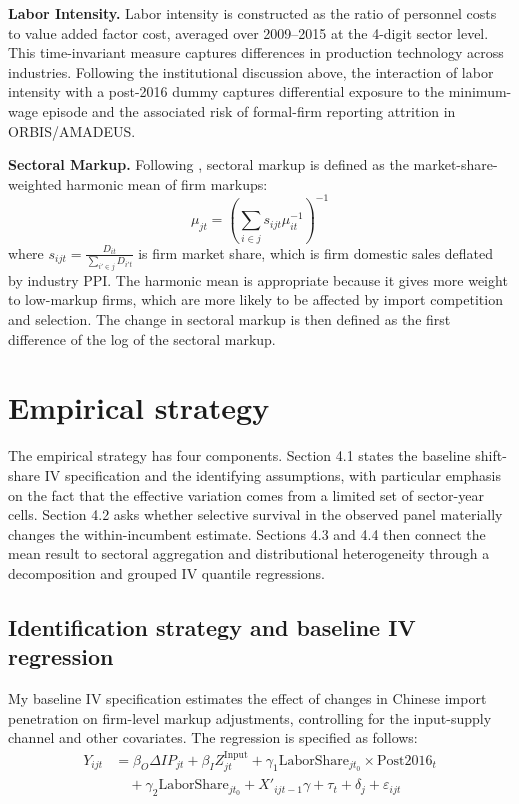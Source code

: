 ﻿\documentclass[12pt]{article}
\begin{document}
\textbf{Labor Intensity.} Labor intensity is constructed as the ratio of personnel costs to value added factor cost, averaged over 2009--2015 at the 4-digit sector level. This time-invariant measure captures differences in production technology across industries. Following the institutional discussion above, the interaction of labor intensity with a post-2016 dummy captures differential exposure to the minimum-wage episode and the associated risk of formal-firm reporting attrition in ORBIS/AMADEUS.

\textbf{Sectoral Markup.} Following \textcite{bursteinBottomUpMarkupFluctuations2025}, sectoral markup is defined as the market-share-weighted harmonic mean of firm markups:
\[
\mu_{jt} = \left( \sum_{i \in j} s_{ijt} \mu_{it}^{-1} \right)^{-1}
\]
where $s_{ijt} = \frac{D_{it}}{\sum_{i' \in j} D_{i't}}$ is firm market share, which is firm domestic sales deflated by industry PPI. The harmonic mean is appropriate because it gives more weight to low-markup firms, which are more likely to be affected by import competition and selection. The change in sectoral markup is then defined as the first difference of the log of the sectoral markup.


\section{Empirical strategy}
\label{sec:empirical_strategy}
The empirical strategy has four components. Section 4.1 states the baseline shift-share IV specification and the identifying assumptions, with particular emphasis on the fact that the effective variation comes from a limited set of sector-year cells. Section 4.2 asks whether selective survival in the observed panel materially changes the within-incumbent estimate. Sections 4.3 and 4.4 then connect the mean result to sectoral aggregation and distributional heterogeneity through a decomposition and grouped IV quantile regressions.

\subsection{Identification strategy and baseline IV regression}
\label{sec:empirical_strategy_iv}

My baseline IV specification estimates the effect of changes in Chinese import penetration on firm-level markup adjustments, controlling for the input-supply channel and other covariates. The regression is specified as follows:
\begin{equation}
\begin{aligned}
Y_{ijt} &= \beta_O \Delta IP_{jt} + \beta_I Z_{jt}^{\text{Input}} + \gamma_1 \text{LaborShare}_{jt_0} \times \text{Post2016}_t \\
&\quad + \gamma_2 \text{LaborShare}_{jt_0} + X'_{ijt-1} \gamma + \tau_t + \delta_j + \varepsilon_{ijt}
\end{aligned}
\end{equation}
\end{document}
